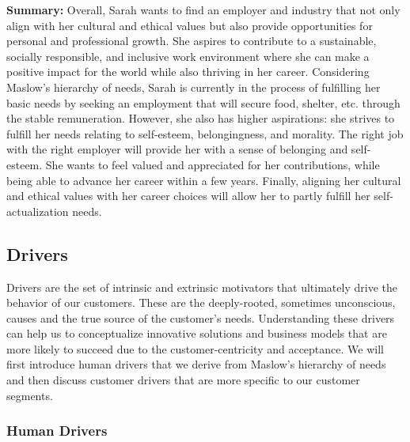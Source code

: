 \noindent\textbf{Summary:}
Overall, Sarah wants to find an employer and industry that not only align with her cultural and ethical values but also provide
opportunities for personal and professional growth. She aspires to contribute to a sustainable, socially responsible, and inclusive
work environment where she can make a positive impact for the world while also thriving in her career. Considering Maslow's hierarchy of needs,
Sarah is currently in the process of fulfilling her basic needs by seeking an employment that will secure food, shelter, etc. through the 
stable remuneration. However, she also has higher aspirations: she strives to fulfill her needs relating to self-esteem, belongingness, and
morality. The right job with the right employer will provide her with a sense of belonging and self-esteem. She wants to feel valued and
appreciated for her contributions, while being able to advance her career within a few years. Finally, aligning her cultural and ethical
values with her career choices will allow her to partly fulfill her self-actualization needs.
\vspace*{0.3cm}

\subsection{Drivers}

Drivers are the set of intrinsic and extrinsic motivators that ultimately drive the behavior of our customers.
These are the deeply-rooted, sometimes unconscious, causes and the true source of the customer's needs. Understanding
these drivers can help us to conceptualize innovative solutions and business models that are more likely to succeed due
to the customer-centricity and acceptance. We will first introduce human drivers that we derive from Maslow's hierarchy
of needs \cite{maslowTheoryHumanMotivation1943} and then discuss customer drivers that are more specific to our
customer segments.

\subsubsection{Human Drivers}

